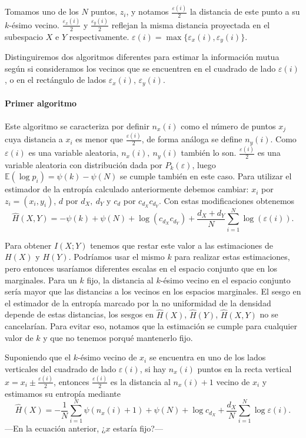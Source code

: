 \documentclass[10pt,a4paper]{article} %
\theoremstyle{definition}
\begin{document}
Tomamos uno de los $N$ puntos, $z_i$, y notamos $\frac{\varepsilon(i)}{2}$ la distancia de este punto a su $k$-ésimo vecino. $\frac{\varepsilon_x(i)}{2}$ y $\frac{\varepsilon_y(i)}{2}$ reflejan la misma distancia proyectada en el subespacio $X$ e $Y$ respectivamente. $\varepsilon(i) = \max \{\varepsilon_x(i), \varepsilon_y(i)\}$.

Distinguiremos dos algoritmos diferentes para estimar la información mutua según si consideramos los vecinos que se encuentren en el cuadrado de lado $\varepsilon(i)$, o en el rectángulo de lados $\varepsilon_x(i)$, $\varepsilon_y(i)$. 

\paragraph{Primer algoritmo}

Este algoritmo se caracteriza por definir $n_x(i)$ como el número de puntos $x_j$ cuya distancia a $x_i$ es menor que $\frac{\varepsilon(i)}{2}$, de forma análoga se define $n_y(i)$. Como $\varepsilon(i)$ es una variable aleatoria, $n_x(i),\ n_y(i)$ también lo son. $\frac{\varepsilon(i)}{2}$ es una variable aleatoria con distribución dada por $P_k(\varepsilon)$, luego $\mathbb{E}(\log p_i) = \psi(k) - \psi(N)$ se cumple también en este caso. Para utilizar el estimador de la entropía calculado anteriormente debemos cambiar: $x_i$ por $z_i=(x_i,y_i)$, $d$ por $d_X,\ d_Y$ y $c_d$ por $c_{d_X}c_{d_Y}$. Con estas modificaciones obtenemos\[
\widehat{H}(X,Y) = - \psi(k) + \psi(N) + \log (c_{d_X}c_{d_Y}) + \frac{d_X+d_Y}{N} \sum_{i=1}^N\log(\varepsilon(i)).
\]

Para obtener $I(X;Y)$ tenemos que restar este valor a las estimaciones de $H(X)$ y $H(Y)$. Podríamos usar el mismo $k$ para realizar estas estimaciones, pero entonces usaríamos diferentes escalas en el espacio conjunto que en los marginales. Para un $k$ fijo, la distancia al $k$-ésimo vecino en el espacio conjunto sería mayor que las distancias a los vecinos en los espacios marginales. El sesgo en el estimador de la entropía marcado por la no uniformidad de la densidad depende de estas distancias, los sesgos en $\widehat{H}(X)$, $\widehat{H}(Y)$, $\widehat{H}(X,Y)$ no se cancelarían. Para evitar eso, notamos que la estimación se cumple para cualquier valor de $k$ y que no tenemos porqué mantenerlo fijo.

Suponiendo que el $k$-ésimo vecino de $x_i$ se encuentra en uno de los lados verticales del cuadrado de lado $\varepsilon(i)$, si hay $n_x(i)$ puntos en la recta vertical $x = x_i \pm \frac{\varepsilon(i)}{2}$, entonces $\frac{\varepsilon(i)}{2}$ es la distancia al $n_x(i) + 1$ vecino de $x_i$ y estimamos su entropía mediante\[
\widehat{H}(X) = - \frac{1}{N}\sum_{i=1}^N\psi(n_x(i)+1) + \psi(N) + \log c_{d_X} + \frac{d_X}{N} \sum_{i=1}^N\log \varepsilon(i).
\]
---En la ecuación anterior, ¿$x$ estaría fijo?---
\end{document}
